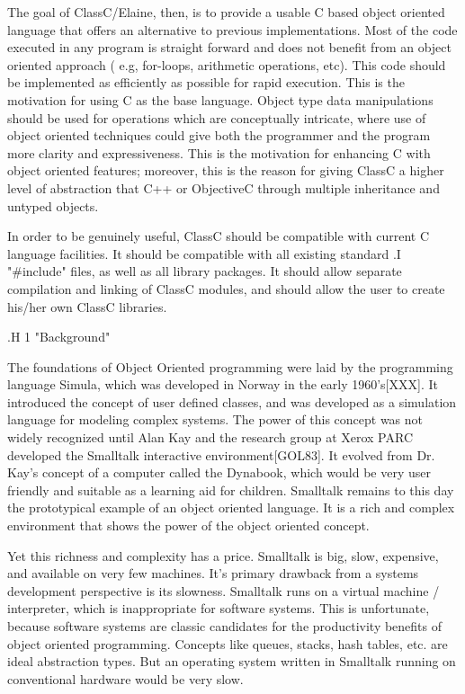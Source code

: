 The goal of ClassC/Elaine, then, is to provide a usable C based object
oriented language that offers an alternative to previous implementations.
Most of the code executed in any program is straight forward and does not
benefit from an object oriented approach ( e.g, for-loops, arithmetic
operations, etc).  This code should be implemented as efficiently as
possible for rapid execution.  This is the motivation for using C as the
base language.  Object type data manipulations should be used for operations
which are conceptually intricate, where use of object oriented techniques
could give both the programmer and the program more clarity and
expressiveness.  This is the motivation for enhancing C with object oriented
features; moreover, this is the reason for giving ClassC a higher level of
abstraction that C++ or ObjectiveC through multiple inheritance
and untyped objects.

In order to be genuinely useful, ClassC should be compatible with current
C language facilities.  It should be compatible with all existing standard
.I "#include"
files, as well as all library packages.  It should allow separate
compilation and linking of ClassC modules, and should allow the user
to create his/her own ClassC libraries.

.H 1 "Background"

The foundations of Object Oriented programming were laid by the
programming language Simula, which was developed in Norway in the early
1960's[XXX].  It introduced the concept of user defined classes, and was
developed as a simulation language for modeling complex systems.
The power of this concept was not widely recognized until Alan Kay and the
research group at Xerox PARC developed the Smalltalk interactive
environment[GOL83].  It evolved from Dr. Kay's concept of a computer called the
Dynabook, which would be very user friendly and suitable as a learning
aid for children.  Smalltalk remains to this day the prototypical example of
an object oriented language.  It is a rich and complex environment that
shows the power of the object oriented concept.

Yet this richness and complexity has a price.  Smalltalk is big, slow,
expensive, and available on very few machines.  It's primary drawback from a
systems development perspective is its slowness.  Smalltalk runs on a
virtual machine / interpreter, which is inappropriate for software
systems.  This is unfortunate, because software systems are classic
candidates for the productivity benefits of object oriented programming.
Concepts like queues, stacks, hash tables, etc. are ideal abstraction
types.  But an operating system written in Smalltalk running on conventional
hardware would be very slow.

